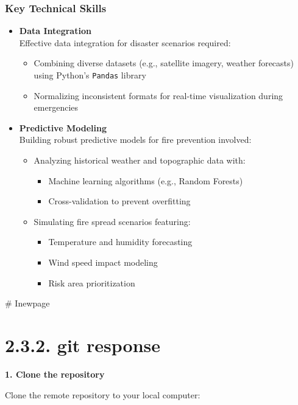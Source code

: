 \documentclass[a4paper, 11pt]{report}
\begin{document}
\subsubsection*{Key Technical Skills}
\begin{itemize}
    \item \textbf{Data Integration} \\
    Effective data integration for disaster scenarios required:
    \begin{itemize}
        \item Combining diverse datasets (e.g., satellite imagery, weather forecasts) using Python’s \texttt{Pandas} library
        \item Normalizing inconsistent formats for real-time visualization during emergencies
    \end{itemize}

    \item \textbf{Predictive Modeling} \\
    Building robust predictive models for fire prevention involved:
    \begin{itemize}
        \item Analyzing historical weather and topographic data with:
        \begin{itemize}
            \item Machine learning algorithms (e.g., Random Forests)
            \item Cross-validation to prevent overfitting
        \end{itemize}
        \item Simulating fire spread scenarios featuring:
        \begin{itemize}
            \item Temperature and humidity forecasting
            \item Wind speed impact modeling
            \item Risk area prioritization
        \end{itemize}
    \end{itemize}
\end{itemize}
\newpage
# Inewpage

\section*{2.3.2. git response}
\textbf{1. Clone the repository}

Clone the remote repository to your local computer:
\end{document}
